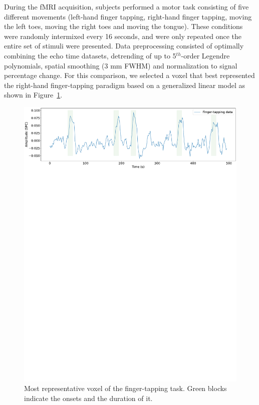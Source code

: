 During the fMRI acquisition, subjects performed a motor task consisting of five different movements (left-hand finger tapping, right-hand finger tapping, moving the left toes, moving the right toes and moving the tongue). These conditions were randomly intermixed every 16 seconds, and were only repeated once the entire set of stimuli were presented. Data preprocessing consisted of optimally combining the echo time datasets, detrending of up to 5\(^{th}\)-order Legendre polynomials, spatial smoothing (3 mm FWHM) and normalization to signal percentage change. For this comparison, we selected a voxel that best represented the right-hand finger-tapping paradigm based on a generalized linear model as shown in Figure~\ref{fig:finger_tapping}.

\begin{figure}[h]
    \begin{center}
        \includegraphics[width=\columnwidth]{figures/finger_tapping.pdf}
    \end{center}
    \caption{Most representative voxel of the finger-tapping task. Green blocks indicate the onsets and the duration of it.}
\label{fig:finger_tapping}
\end{figure}

